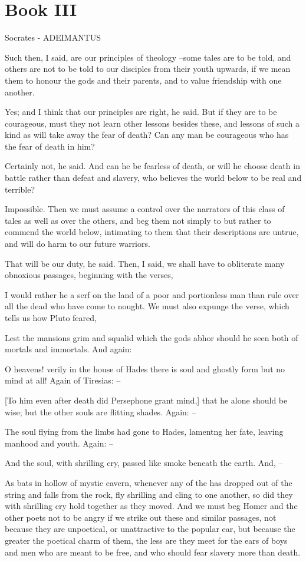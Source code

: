 \chapter{Book III}

Socrates - ADEIMANTUS

Such then, I said, are our principles of theology --some tales are to be told, and others are not to be told to our disciples from their youth upwards, if we mean them to honour the gods and their parents, and to value friendship with one another.

Yes; and I think that our principles are right, he said.
But if they are to be courageous, must they not learn other lessons besides these, and lessons of such a kind as will take away the fear of death? Can any man be courageous who has the fear of death in him?

Certainly not, he said.
And can he be fearless of death, or will he choose death in battle rather than defeat and slavery, who believes the world below to be real and terrible?

Impossible.
Then we must assume a control over the narrators of this class of tales as well as over the others, and beg them not simply to but rather to commend the world below, intimating to them that their descriptions are untrue, and will do harm to our future warriors.

That will be our duty, he said.
Then, I said, we shall have to obliterate many obnoxious passages, beginning with the verses,

I would rather he a serf on the land of a poor and portionless man than rule over all the dead who have come to nought. We must also expunge the verse, which tells us how Pluto feared,

Lest the mansions grim and squalid which the gods abhor should he seen both of mortals and immortals. And again:

O heavens! verily in the house of Hades there is soul and ghostly form but no mind at all! Again of Tiresias: --

[To him even after death did Persephone grant mind,] that he alone should be wise; but the other souls are flitting shades. Again: --

The soul flying from the limbs had gone to Hades, lamentng her fate, leaving manhood and youth. Again: --

And the soul, with shrilling cry, passed like smoke beneath the earth. And, --

As bats in hollow of mystic cavern, whenever any of the has dropped out of the string and falls from the rock, fly shrilling and cling to one another, so did they with shrilling cry hold together as they moved. And we must beg Homer and the other poets not to be angry if we strike out these and similar passages, not because they are unpoetical, or unattractive to the popular ear, but because the greater the poetical charm of them, the less are they meet for the ears of boys and men who are meant to be free, and who should fear slavery more than death.

